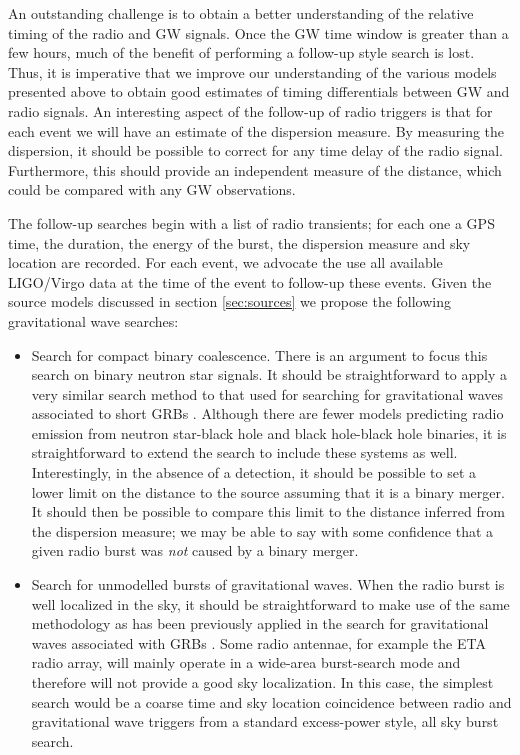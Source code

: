 An outstanding challenge is to obtain a better understanding of the
relative timing of the radio and GW signals.  Once the GW time window is
greater than a few hours, much of the benefit of performing a follow-up style
search is lost.  Thus, it is imperative that we improve our
understanding of the various models presented above to obtain good
estimates of timing differentials between GW and radio signals.  An
interesting aspect of the follow-up of radio triggers is that for each event
we will have an estimate of the dispersion measure.  By measuring the
dispersion, it should be possible to correct for any time delay of the
radio signal.  Furthermore, this should provide an independent
measure of the distance, which could be compared with any GW
observations.

The follow-up searches begin with a list of radio transients; for each
one a GPS time, the duration, the energy of the burst, the dispersion
measure and sky location are recorded. For each event, we advocate the use all available
LIGO/Virgo data at the time of the event to follow-up these events.
Given the source models discussed in section \ref{sec:sources} we
propose the following gravitational wave searches:

\begin{itemize}

\item Search for compact binary coalescence.  There is an argument to
focus this search on binary neutron star signals.  It should be straightforward to apply
a very similar search method to that used for searching for
gravitational waves associated to short GRBs \cite{Abbott:2007rh}.  Although
there are fewer models predicting radio emission from neutron star-black
hole and black hole-black hole binaries, it is straightforward to extend
the search to include these systems as well.  Interestingly, in the absence of a
detection, it should be possible to set a lower limit on the distance to
the source assuming that it is a binary merger. It should then be
possible to compare this limit to the distance inferred from the
dispersion measure; we may be able to say with some confidence that a given
radio burst was {\em not} caused by a binary merger.

\item Search for unmodelled bursts of gravitational waves.  When the radio
burst is well localized in the sky, it should be straightforward to make
use of the same methodology as has been previously applied in the search
for gravitational waves associated with GRBs \cite{Collaboration:2009kk}.  Some
radio antennae, for example the ETA radio array, will mainly operate in
a wide-area burst-search mode and therefore will not provide a good sky
localization.  In this case, the simplest search would be a coarse time
and sky location coincidence between radio and gravitational wave
triggers from a standard excess-power style, all sky burst search.

\end{itemize}

